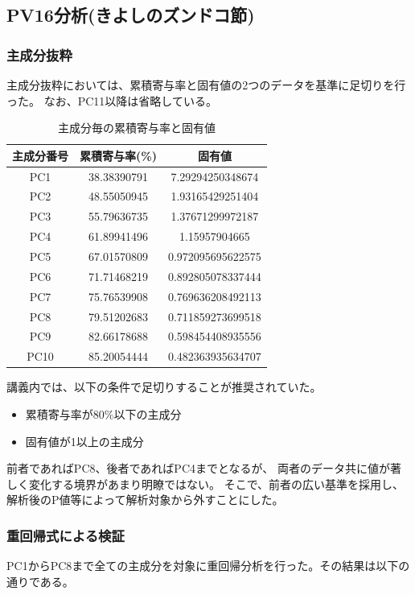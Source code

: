\documentclass[11pt,a4paper, uplatex]{jsarticle}
\begin{document}
\subsection{PV16分析(きよしのズンドコ節)}
\subsubsection{主成分抜粋}
主成分抜粋においては、累積寄与率と固有値の2つのデータを基準に足切りを行った。
なお、PC11以降は省略している。

\begin{table}[htbp]
  \begin{center}
    \caption{主成分毎の累積寄与率と固有値}
    \begin{tabular}{c|c|c}
      \hline
      主成分番号 & 累積寄与率(\%) & 固有値 \\ \hline \hline
      PC1 & 38.38390791 & 7.29294250348674 \\
      PC2 & 48.55050945 & 1.93165429251404 \\
      PC3 & 55.79636735 & 1.37671299972187 \\
      PC4 & 61.89941496 & 1.15957904665 \\
      PC5 & 67.01570809 & 0.972095695622575 \\
      PC6 & 71.71468219 & 0.892805078337444 \\
      PC7 & 75.76539908 & 0.769636208492113 \\
      PC8 & 79.51202683 & 0.711859273699518 \\
      PC9 & 82.66178688 & 0.598454408935556 \\
      PC10 & 85.20054444 & 0.482363935634707 \\
      \hline
    \end{tabular}
  \end{center}
\end{table}

講義内では、以下の条件で足切りすることが推奨されていた。

\begin{itemize}
  \item 累積寄与率が80\%以下の主成分
  \item 固有値が1以上の主成分
\end{itemize}

前者であればPC8、後者であればPC4までとなるが、
両者のデータ共に値が著しく変化する境界があまり明瞭ではない。
そこで、前者の広い基準を採用し、解析後のP値等によって解析対象から外すことにした。

\subsubsection{重回帰式による検証}
PC1からPC8まで全ての主成分を対象に重回帰分析を行った。その結果は以下の通りである。
\end{document}
